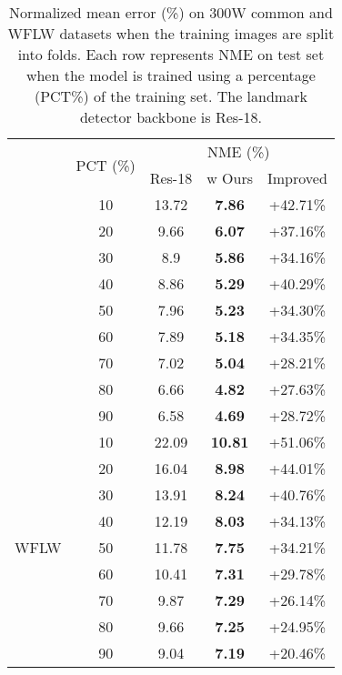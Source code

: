 \documentclass[10pt,twocolumn,letterpaper]{article}
\begin{document}
\begin{table}[t]
	\begin{center}\small
\begin{tabular}{ccccc}
				\Xhline{1.2pt}
				\multirow{2}{*}{Dataset} & \multirow{2}{*}{PCT (\%)} & \multicolumn{3}{c}{NME (\%)} \\ \cline{3-5} 
				&  & Res-18 & w Ours & Improved \\ \Xhline{1.2pt}
				\multicolumn{1}{c|}{\multirow{9}{*}{300W}} & 10 & 13.72 & \textbf{7.86} & +42.71\% \\
				\multicolumn{1}{c|}{} & 20 & 9.66 & \textbf{6.07} & +37.16\% \\
				\multicolumn{1}{c|}{} & 30 & 8.9 & \textbf{5.86} & +34.16\% \\
				\multicolumn{1}{c|}{} & 40 & 8.86 & \textbf{5.29} & +40.29\% \\
				\multicolumn{1}{c|}{} & 50 & 7.96 & \textbf{5.23} & +34.30\% \\
				\multicolumn{1}{c|}{} & 60 & 7.89 & \textbf{5.18} & +34.35\% \\
				\multicolumn{1}{c|}{} & 70 & 7.02 & \textbf{5.04} & +28.21\% \\
				\multicolumn{1}{c|}{} & 80 & 6.66 & \textbf{4.82} & +27.63\% \\
				\multicolumn{1}{c|}{} & 90 & 6.58 & \textbf{4.69} & +28.72\% \\ \hline
				\multicolumn{1}{c|}{\multirow{9}{*}{WFLW}} & 10 & 22.09 & \textbf{10.81} & +51.06\% \\
				\multicolumn{1}{c|}{} & 20 & 16.04 & \textbf{8.98} & +44.01\% \\
				\multicolumn{1}{c|}{} & 30 & 13.91 & \textbf{8.24} & +40.76\% \\
				\multicolumn{1}{c|}{} & 40 & 12.19 & \textbf{8.03} & +34.13\% \\
				\multicolumn{1}{c|}{} & 50 & 11.78 & \textbf{7.75} & +34.21\% \\
				\multicolumn{1}{c|}{} & 60 & 10.41 & \textbf{7.31} & +29.78\% \\
				\multicolumn{1}{c|}{} & 70 & 9.87 & \textbf{7.29} & +26.14\% \\
				\multicolumn{1}{c|}{} & 80 & 9.66 & \textbf{7.25} & +24.95\% \\
				\multicolumn{1}{c|}{} & 90 & 9.04 & \textbf{7.19} & +20.46\% \\ \hline
			\end{tabular}
\end{center}
	\vspace{-0.5cm}
	\caption{\label{tb_ablation_Res} \small{Normalized mean error (\%) on 300W common and WFLW datasets when the training images are split into  folds. Each row represents NME on test set when the model is trained using a percentage (PCT\%) of the training set. The landmark detector backbone is Res-18.}}
\end{table}
\end{document}
